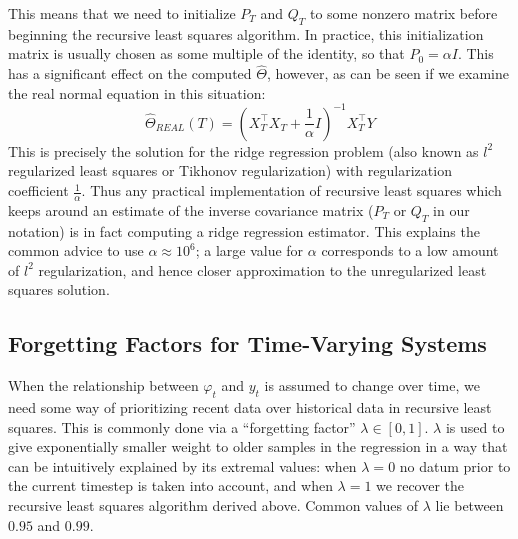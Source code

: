 This means that we need to initialize $P_T$ and $Q_T$ to some nonzero matrix
before beginning the recursive least squares algorithm. In practice, this
initialization matrix is usually chosen as some multiple of the identity, so
that $P_0 = \alpha I$. This has a significant effect on the computed $\hat\Theta$, however, as can be seen if we examine the real normal equation in this situation:
\begin{equation}
  \hat\Theta_{REAL}(T) = (X_T^\top X_T + \frac{1}{\alpha} I)^{-1}X_T^\top Y
\end{equation}
This is precisely the solution for the ridge regression problem (also known as
$l^2$ regularized least squares or Tikhonov regularization) with regularization
coefficient $\frac{1}{\alpha}$. Thus any practical implementation of recursive
least squares which keeps around an estimate of the inverse covariance matrix
($P_T$ or $Q_T$ in our notation) is in fact computing a ridge regression
estimator. This explains the common advice to use $\alpha \approx 10^6$; a
large value for $\alpha$ corresponds to a low amount of $l^2$ regularization,
and hence closer approximation to the unregularized least squares solution.

\subsection{Forgetting Factors for Time-Varying Systems}
When the relationship between $\varphi_t$ and $y_t$ is assumed to change over
time, we need some way of prioritizing recent data over historical data in
recursive least squares. This is commonly done via a ``forgetting factor''
$\lambda \in [0, 1]$. $\lambda$ is used to give exponentially smaller weight to
older samples in the regression in a way that can be intuitively explained by
its extremal values: when $\lambda = 0$ no datum prior to the current timestep
is taken into account, and when $\lambda = 1$ we recover the recursive least
squares algorithm derived above. Common values of $\lambda$ lie between $0.95$
and $0.99$.

